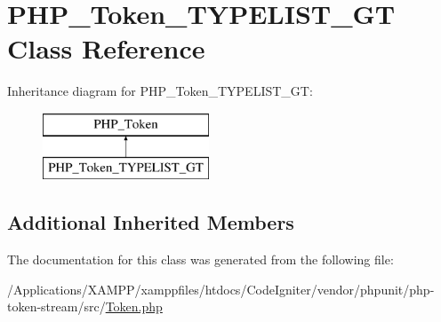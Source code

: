 \hypertarget{class_p_h_p___token___t_y_p_e_l_i_s_t___g_t}{}\section{P\+H\+P\+\_\+\+Token\+\_\+\+T\+Y\+P\+E\+L\+I\+S\+T\+\_\+\+GT Class Reference}
\label{class_p_h_p___token___t_y_p_e_l_i_s_t___g_t}
Inheritance diagram for P\+H\+P\+\_\+\+Token\+\_\+\+T\+Y\+P\+E\+L\+I\+S\+T\+\_\+\+GT\+:\begin{figure}[H]
\begin{center}
\leavevmode
\includegraphics[height=2.000000cm]{class_p_h_p___token___t_y_p_e_l_i_s_t___g_t}
\end{center}
\end{figure}
\subsection*{Additional Inherited Members}


The documentation for this class was generated from the following file\+:\begin{DoxyCompactItemize}
\item 
/\+Applications/\+X\+A\+M\+P\+P/xamppfiles/htdocs/\+Code\+Igniter/vendor/phpunit/php-\/token-\/stream/src/\mbox{\hyperlink{_token_8php}{Token.\+php}}\end{DoxyCompactItemize}
